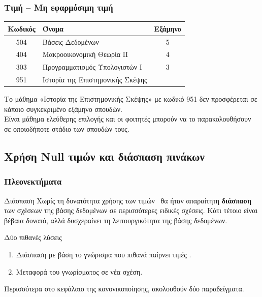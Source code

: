 \begin{frame}[t, fragile]
\frametitle{Τιμή \tnull -- Μη εφαρμόσιμη τιμή}
\begin{minipage}{\wE}
  \begin{tabular}{ c l c } \toprule
    {\bf Κωδικός} & {\bf Όνομα} & {\bf Εξάμηνο} \\ \midrule 
    504 & Βάσεις Δεδομένων & 5 \\ 
    404 & Μακροοικονομική Θεωρία ΙΙ & 4 \\  
    303 & Προγραμματισμός Υπολογιστών Ι & 3 \\   
    951 & Ιστορία της Επιστημονικής Σκέψης &  \\  \bottomrule
  \end{tabular}
  \bigskip
  \par Το μάθημα «Ιστορία της Επιστημονικής Σκέψης» με κωδικό 951 δεν προσφέρεται σε κάποιο
  συγκεκριμένο εξάμηνο σπουδών. \\ 
  Είναι μάθημα ελεύθερης επιλογής και οι φοιτητές
  μπορούν να το παρακολουθήσουν σε οποιοδήποτε στάδιο των σπουδών τους.
\end{minipage}  
\end{frame}



\subsection[\textlatin{NotNull}] {\textgreek {Χρήση} \textlatin{Null} τιμών και διάσπαση πινάκων}

\begin{frame}[t, fragile]
\frametitle{Πλεονεκτήματα}
\begin{minipage}{\wE}
  \begin{block}{Διάσπαση}
    Χωρίς τη δυνατότητα χρήσης των τιμών \tnull\ θα ήταν απαραίτητη {\bf\color{red} διάσπαση}
    των σχέσεων της βάσης δεδομένων σε περισσότερες ειδικές σχέσεις.
    Κάτι τέτοιο είναι βέβαια δυνατό, αλλά δυσχεραίνει τη λειτουργικότητα της βάσης δεδομένων. 
  \end{block}
  \pause
  \begin{block}{Δύο πιθανές λύσεις}
    \begin{enumerate}
      \item Διάσπαση με βάση το γνώρισμα που πιθανά παίρνει τιμές \tnull.
      \item Μεταφορά του γνωρίσματος σε νέα σχέση.
    \end{enumerate}
  \end{block}
  \par \color{blue} Περισσότερα στο κεφάλαιο της κανονικοποίησης, ακολουθούν δύο παραδείγματα.
\end{minipage}  
\end{frame}


